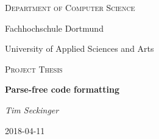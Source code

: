 {\centering
  {\small\scshape Department of Computer Science \par}
  {\large Fachhochschule Dortmund \par}
  {\large University of Applied Sciences and Arts \par}
  \vspace{1cm}
  {\large\scshape Project Thesis \par}
  \vspace{3cm}

  {\huge\bfseries Parse-free code formatting \par}
  \vspace{2cm}
  {\large\itshape Tim Seckinger \par}
  \vfill

  {\large 2018-04-11}
}
